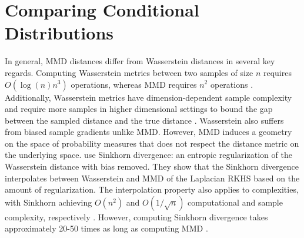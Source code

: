 



\section{Comparing Conditional Distributions}\label{appendix:comparing}
In general, MMD distances differ from Wasserstein distances in several key regards. Computing Wasserstein metrics between two samples of size $n$ requires $O(\log(n)n^3)$ operations, whereas MMD requires $n^2$ operations \citep{pele2009fast}. Additionally, Wasserstein metrics have dimension-dependent sample complexity and require more samples in higher dimensional settings to bound the gap between the sampled distance and the true distance \citep{genevay2019sample}. Wasserstein also suffers from biased sample gradients \citep{bellemare2017cramer} unlike MMD. However, MMD induces a geometry on the space of probability measures that does not respect the distance metric on the underlying space. \citet{feydy2019interpolating} use Sinkhorn divergence: an entropic regularization of the Wasserstein distance with bias removed. They show that the Sinkhorn divergence interpolates between Wasserstein and MMD of the Laplacian RKHS based on the amount of regularization. The interpolation property also applies to complexities, with Sinkhorn achieving $O(n^2)$ and $O(1/\sqrt{n})$ computational and sample complexity, respectively \citep{genevay2019sample}. However, computing Sinkhorn divergence takes approximately 20-50 times as long as computing MMD \citep{feydy2019interpolating}. 

